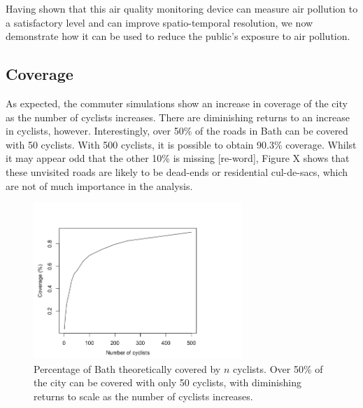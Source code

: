 \documentclass[11pt]{report}
\begin{document}
Having shown that this air quality monitoring device can measure air pollution to a satisfactory level and can improve spatio-temporal resolution, we now demonstrate how it can be used to reduce the public's exposure to air pollution.

\subsection{Coverage}

As expected, the commuter simulations show an increase in coverage of the city as the number of cyclists increases. There are diminishing returns to an increase in cyclists, however. Interestingly, over 50\% of the roads in Bath can be covered with 50 cyclists. With 500 cyclists, it is possible to obtain 90.3\% coverage. Whilst it may appear odd that the other 10\% is missing [re-word], Figure X shows that these unvisited roads are likely to be dead-ends or residential cul-de-sacs, which are not of much importance in the analysis.


\begin{figure}[!tb]
\centering
\includegraphics[width=0.7\textwidth]{images/coverage}
\caption[Cyclist coverage.]{Percentage of Bath theoretically covered by $n$ cyclists. Over 50\% of the city can be covered with only 50 cyclists, with diminishing returns to scale as the number of cyclists increases.}
\label{fig:coverage}
\end{figure}

\end{document}

